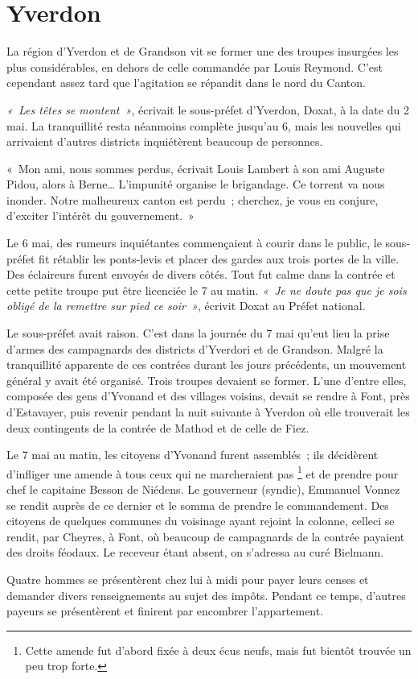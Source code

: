 \documentclass[french,twoside]{book} %
\newenvironment{quoteblock}%
  {\begin{quoting}}
  {\end{quoting}}
\newenvironment{quotebar}{%
    \def\FrameCommand{{\color{rubric!10!}\vrule width 0.5em} \hspace{0.9em}}%
    \def\OuterFrameSep{\itemsep} %
    \MakeFramed {\advance\hsize-\width \FrameRestore}
  }%
  {%
    \endMakeFramed
  }
\renewenvironment{quoteblock}%
  {%
    \savenotes
    \setstretch{0.9}
    \normalfont
    \begin{quotebar}
  }
  {%
    \end{quotebar}
    \spewnotes
  }
\begin{document}
\section[{Yverdon}]{Yverdon}
\noindent La région d’Yverdon et de Grandson vit se former une des troupes insurgées les plus considérables, en dehors de celle commandée par Louis Reymond. C’est cependant assez tard que l’agitation se répandit dans le nord du Canton.\par
\emph{« Les têtes se montent »}, écrivait le sous-préfet d’Yverdon, Doxat, à la date du 2 mai. La tranquillité resta néanmoins complète jusqu’au 6, mais les nouvelles qui arrivaient d’autres districts inquiétèrent beaucoup de personnes.\par

\begin{quoteblock}
 \noindent « Mon ami, nous sommes perdus, écrivait Louis Lambert à son ami Auguste Pidou, alors à Berne… L’impunité organise le brigandage. Ce torrent va nous inonder. Notre malheureux canton est perdu ; cherchez, je vous en conjure, d’exciter l’intérêt du gouvernement. »
 \end{quoteblock}

\noindent Le 6 mai, des rumeurs inquiétantes commençaient à courir dans le public, le sous-préfet fit rétablir les ponts-levis et placer des gardes aux trois portes de la ville. Des éclaireurs furent envoyés de divers côtés. Tout fut calme dans la contrée et cette petite troupe put être licenciée le 7 au matin. \emph{« Je ne doute pas que je sois obligé de la remettre sur pied ce soir »}, écrivit Doxat au Préfet national.\par
Le sous-préfet avait raison. C’est dans la journée du 7 mai qu’eut lieu la prise d’armes des campagnards des districts d’Yverdori et de Grandson. Malgré la tranquillité apparente de ces contrées durant les jours précédents, un mouvement général y avait été organisé. Trois troupes devaient se former. L’une d’entre elles, composée des gens d’Yvonand et des villages voisins, devait se rendre à Font, près d’Estavayer, puis revenir pendant la nuit suivante à Yverdon où elle trouverait les deux contingents de la contrée de Mathod et de celle de Fiez.\par
Le 7 mai au matin, les citoyens d’Yvonand furent assemblés ; ils décidèrent d’infliger une amende à tous ceux qui ne marcheraient pas \footnote{Cette amende fut d’abord fixée à deux écus neufs, mais fut bientôt trouvée un peu trop forte.} et de prendre pour chef le capitaine Besson de Niédens. Le gouverneur (syndic), Emmanuel Vonnez se rendit auprès de ce dernier et le somma de prendre le commandement. Des citoyens de quelques communes du voisinage ayant rejoint la colonne, celleci se rendit, par Cheyres, à Font, où beaucoup de campagnards de la contrée payaient des droits féodaux. Le receveur étant absent, on s’adressa au curé Bielmann.\par
Quatre hommes se présentèrent chez lui à midi pour payer leurs censes et demander divers renseignements au sujet des impôts. Pendant ce temps, d’autres payeurs se présentèrent et finirent par encombrer l’appartement.\par
\end{document}
